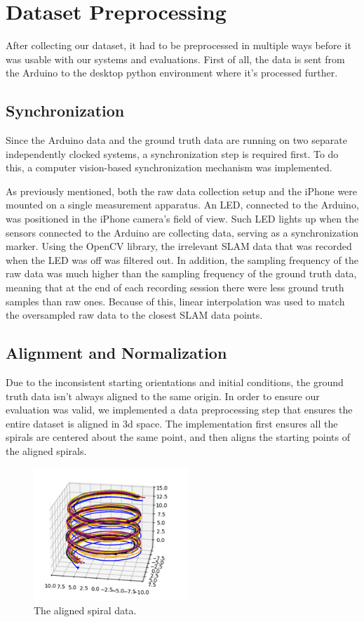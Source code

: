 \section{Dataset Preprocessing}
After collecting our dataset, it had to be preprocessed in multiple ways before it was usable with our systems and evaluations. First of all, the data is sent from the Arduino to the desktop python environment where it's processed further.

\subsection{Synchronization}
Since the Arduino data and the ground truth data are running on two separate independently clocked systems, a synchronization step is required first. To do this, a computer vision-based synchronization mechanism was implemented. 
\par
As previously mentioned, both the raw data collection setup and the iPhone were mounted on a single measurement apparatus. An LED, connected to the Arduino, was positioned in the iPhone camera's field of view. Such LED lights up when the sensors connected to the Arduino are collecting data, serving as a synchronization marker. Using the OpenCV library, the irrelevant SLAM data that was recorded when the LED was off was filtered out. In addition, the sampling frequency of the raw data was much higher than the sampling frequency of the ground truth data, meaning that at the end of each recording session there were less ground truth samples than raw ones. Because of this, linear interpolation was used to match the oversampled raw data to the closest SLAM data points.

\subsection{Alignment and Normalization}
Due to the inconsistent starting orientations and initial conditions, the ground truth data isn't always aligned to the same origin. In order to ensure our evaluation was valid, we implemented a data preprocessing step that ensures the entire dataset is aligned in 3d space. The implementation first ensures all the spirals are centered about the same point, and then aligns the starting points of the aligned spirals.

\begin{figure}[h] 
	\centering \includegraphics[height=5cm]{./images/aligned_data.png}
	\caption{The aligned spiral data.}
\end{figure}

